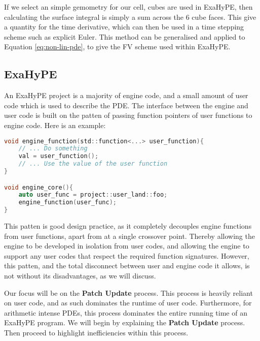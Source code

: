 If we select an simple gemometry for our cell, cubes are used in ExaHyPE, then calculating the surface integral is simply a sum across the 6 cube faces.
This give a quantity for the time derivative, which can then be used in a time stepping scheme such as explicit Euler.
This method can be generalised and applied to Equation \ref{eq:non-lin-pde}, to give the FV scheme used within ExaHyPE.  

\subsection{ExaHyPE}


\newcommand{\proc}[1]{\textbf{#1}}

An ExaHyPE project is a majority of engine code, and a small amount of user code which is used to describe the PDE.
The interface between the engine and user code is built on the patten of passing function pointers of user functions to engine code.
Here is an example:
\begin{lstlisting}[language=c]
void engine_function(std::function<...> user_function){
    // ... Do something
    val = user_function();
    // ... Use the value of the user function 
}

void engine_core(){
    auto user_func = project::user_land::foo;
    engine_function(user_func);
}
\end{lstlisting}

This patten is good design practice, as it completely decouples engine functions from user functions, apart from at a single crossover point.
Thereby allowing the engine to be developed in isolation from user codes, and allowing the engine to support any user codes that respect the required function signatures.
However, this patten, and the total disconnect between user and engine code it allows, is not without its disadvantages, as we will discuss.

Our focus will be on the \proc{Patch Update} process.
This process is heavily reliant on user code, and as such dominates the runtime of user code.
Furthermore, for arithmetic intense PDEs, this process dominates the entire running time of an ExaHyPE program.
We will begin by explaining the \proc{Patch Update} process.
Then proceed to highlight inefficiencies within this process. 

